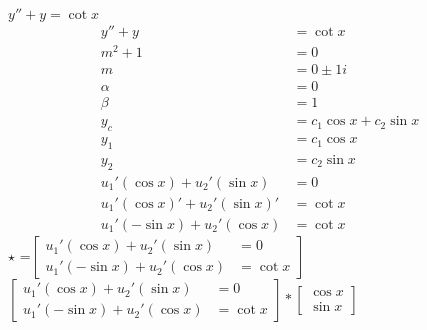 \begin{ex}
$y''+y=\cot x$
\begin{align*}
y''+y&=\cot x\\
    m^2+1&=0\\
    m&=0 \pm 1i\\
    \alpha &=0\\
    \beta &=1\\
    y_c &= c_1\cos x + c_2 \sin x\\
    y_1&=c_1\cos x \\
    y_2&= c_2 \sin x\\
    u_1'(\cos x)+u_2'(\sin x) &= 0\\
    u_1'(\cos x)' + u_2'(\sin x)' &=\cot x\\
    u_1'(-\sin x) + u_2'(\cos x) &=\cot x
\end{align*}
$\star$ =$\left[
                \begin{array}{ll}
                  u_1'(\cos x)+u_2'(\sin x) &= 0\\
                  u_1'(-\sin x) + u_2'(\cos x) &=\cot x
                \end{array}
              \right] $\\
$\left[
                \begin{array}{ll}
                  u_1'(\cos x)+u_2'(\sin x) &= 0\\
                  u_1'(-\sin x) + u_2'(\cos x) &=\cot x
                \end{array}
              \right] *\left[
              \begin{array}{ll}
                   \cos x\\
                   \sin x
              \end{array}
              \right]
              $
\end{ex}
